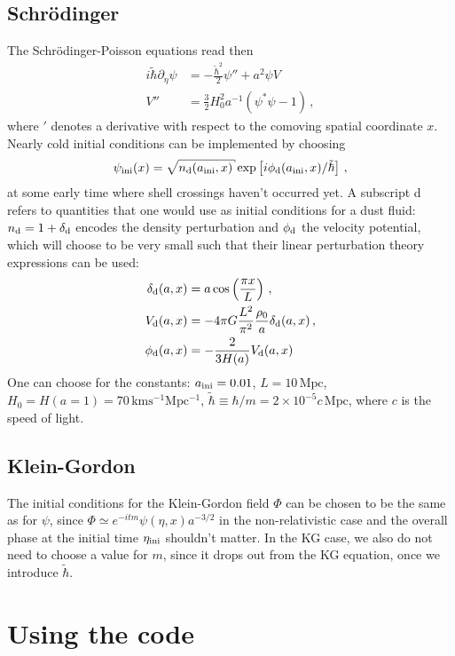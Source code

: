\documentclass[amsmath,amssymb,12pt, eqsecnum]{revtex4}
\begin{document}
\subsection{Schr\"odinger}
The Schr\"odinger-Poisson equations read then
\begin{align}
i \tilde{\hbar} \partial_\eta  \psi &= - \frac{\tilde{\hbar}^2}{2 } \psi'' + a^2 \psi V\\
V'' &=  \tfrac{3}{2} H_0^2 a^{-1} (\psi^* \psi -1)\,,
\end{align}
where $'$ denotes a derivative with respect to the comoving spatial coordinate $x$. Nearly cold initial conditions can be implemented by choosing 
\begin{equation}\label{inipsi}
\psi_{\rm{ini}}(x)= \sqrt{n_{\rm d}(a_{\rm{ini}},x)} \exp\left[ i \phi_{\rm d}(a_{\rm{ini}},x)/\tilde \hbar \right]\,,
\end{equation}
at some early time where shell crossings haven't occurred yet. A subscript d refers to quantities that one would use as initial conditions for a dust fluid: $n_{\rm d} = 1 + \delta_{\rm d}$ encodes the density perturbation and $\phi_{\rm d}$ the velocity potential, which will choose to be very small such that their linear perturbation theory expressions can be used:
\begin{align} \label{delini}
\delta_{\rm d}(a,x) &= a \cos\left(\frac{\pi x}{L}\right) \,,\\
V_{\rm d}(a,x) &= -  4 \pi G \frac{L^2}{\pi^2} \frac{\rho_0}{a}  \delta_{\rm d}(a,x) \,,\\
\phi_{\rm d}(a,x) &= -\frac{2}{3 H(a)}V_{\rm d}(a,x)
\end{align}
One can choose for the constants: $a_{\rm ini} =0.01$, $L=10\,\mathrm{Mpc}$, $H_0 = H(a=1) = 70\,\mathrm{km s^{-1} Mpc^{-1}}$, $\tilde \hbar\equiv \hbar/m = 2\times 10^{-5} c\, \mathrm{Mpc}$, where $c$ is the speed of light.
\subsection{Klein-Gordon}
The initial conditions for the Klein-Gordon field $\Phi$ can be chosen to be the same as for $\psi$, since $\Phi \simeq e^{- i t m} \psi(\eta, x) a^{-3/2}$  in the non-relativistic case and the overall phase at the initial time $\eta_{\rm ini}$ shouldn't matter. In the KG case, we also do not need to choose a value for $m$, since it drops out from the KG equation, once we introduce $\tilde \hbar$.
\appendix
\section{Using the code}
\end{document}
